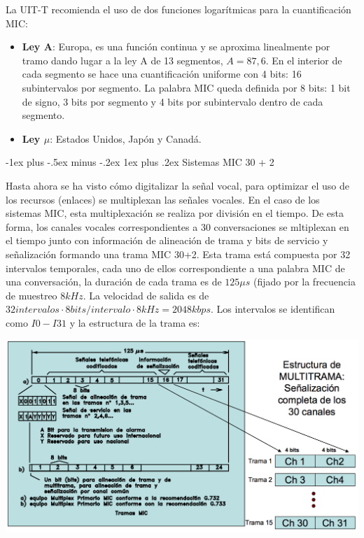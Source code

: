 \documentclass[10pt,portrait, twocolumn]{article}
\makeatletter
\renewcommand{\subsubsection}{\@startsection{subsubsection}{3}{0mm}%
                                {-1ex plus -.5ex minus -.2ex}%
                                {1ex plus .2ex}%
                                {\normalfont\small\bfseries}}
\makeatother
\begin{document}
La UIT-T recomienda el uso de dos funciones logarítmicas para la cuantificación MIC:

	\begin{itemize}
		\item \textbf{Ley A}: Europa, es una función continua y se aproxima linealmente por tramo dando lugar a la ley A de 13 segmentos, $A = 87,6$. En el interior de cada segmento se hace una cuantificación uniforme con 4 bits: 16 subintervalos por segmento. La palabra MIC queda definida por 8 bits: 1 bit de signo, 3 bits por segmento y 4 bits por subintervalo dentro de cada segmento.
		\item \textbf{Ley $\mu$}: Estados Unidos, Japón y Canadá.
	\end{itemize}

\subsubsection{Sistemas MIC 30 + 2}

Hasta ahora se ha visto cómo digitalizar la señal vocal, para optimizar el uso de los recursos (enlaces) se multiplexan las señales vocales. En el caso de los sistemas MIC, esta multiplexación se realiza por división en el tiempo. De esta forma, los canales vocales correspondientes a 30 conversaciones se mltiplexan en el tiempo junto con información de alineación de trama y bits de servicio y señalización formando una trama MIC 30+2. Esta trama está compuesta por 32 intervalos temporales, cada uno de ellos correspondiente a una palabra MIC de una conversación, la duración de cada trama es de $125 \mu s$ (fijado por la frecuencia de muestreo $8kHz$. La velocidad de salida es de $32 intervalos \cdot 8 bits / intervalo \cdot 8 kHz = 2048 kbps$. Los intervalos se identifican como $I0 - I31$ y la estructura de la trama es:
	
	\begin{center}
		\includegraphics[scale=0.2]{images/TramaMIC}
	\end{center}
\end{document}
